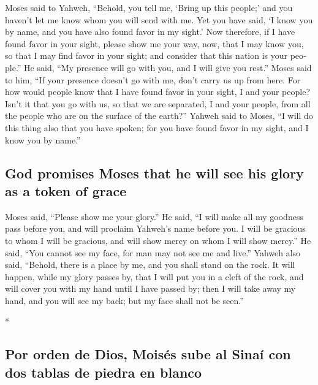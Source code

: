 \begin{paracol}{2}
\begin{otherlanguage}{english}
 Moses said to Yahweh, ``Behold, you tell me, `Bring up
this people;' and you haven't let me know whom you will send with me.
Yet you have said, `I know you by name, and you have also found favor in
my sight.'  Now therefore, if I have found favor in your
sight, please show me your way, now, that I may know you, so that I may
find favor in your sight; and consider that this nation is your
people.''  He said, ``My presence will go with you, and I
will give you rest.''  Moses said to him, ``If your
presence doesn't go with me, don't carry us up from here.
 For how would people know that I have found favor in
your sight, I and your people? Isn't it that you go with us, so that we
are separated, I and your people, from all the people who are on the
surface of the earth?''  Yahweh said to Moses, ``I will
do this thing also that you have spoken; for you have found favor in my
sight, and I know you by name.''

\hypertarget{god-promises-moses-that-he-will-see-his-glory-as-a-token-of-grace}{%
\subsection{God promises Moses that he will see his glory as a token of
grace}\label{god-promises-moses-that-he-will-see-his-glory-as-a-token-of-grace}}

 Moses said, ``Please show me your glory.''
 He said, ``I will make all my goodness pass before you,
and will proclaim Yahweh's name before you. I will be gracious to whom I
will be gracious, and will show mercy on whom I will show mercy.''
 He said, ``You cannot see my face, for man may not see
me and live.''  Yahweh also said, ``Behold, there is a
place by me, and you shall stand on the rock.  It will
happen, while my glory passes by, that I will put you in a cleft of the
rock, and will cover you with my hand until I have passed by;
 then I will take away my hand, and you will see my back;
but my face shall not be seen.''

\end{otherlanguage}

\switchcolumn[0]*

\hypertarget{por-orden-de-dios-moisuxe9s-sube-al-sinauxed-con-dos-tablas-de-piedra-en-blanco}{%
\subsection{Por orden de Dios, Moisés sube al Sinaí con dos tablas de
piedra en
blanco}\label{por-orden-de-dios-moisuxe9s-sube-al-sinauxed-con-dos-tablas-de-piedra-en-blanco}}


\end{paracol}
